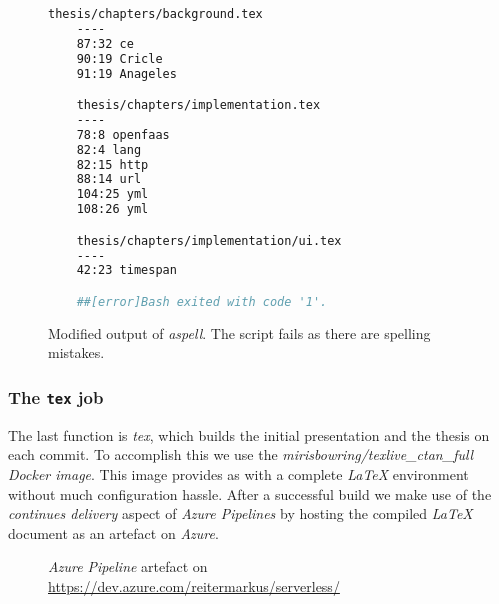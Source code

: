 \begin{figure}[H]
  \begin{lstlisting}[language=bash, basicstyle=\small\ttfamily]
    thesis/chapters/background.tex
    ----
    87:32 ce
    90:19 Cricle
    91:19 Anageles

    thesis/chapters/implementation.tex
    ----
    78:8 openfaas
    82:4 lang
    82:15 http
    88:14 url
    104:25 yml
    108:26 yml

    thesis/chapters/implementation/ui.tex
    ----
    42:23 timespan

    ##[error]Bash exited with code '1'.
  \end{lstlisting}
  \caption{Modified output of \textit{aspell}. The script fails as there are spelling mistakes.}
\end{figure}

\subsubsection{The \texttt{tex} job}

The last function is \textit{tex}, which builds the initial presentation and the thesis on each
commit. To accomplish this we use the \textit{mirisbowring/texlive\_ctan\_full Docker image}. This
image provides as with a complete \textit{LaTeX} environment without much configuration hassle.
After a successful build we make use of the \textit{continues delivery} aspect of \textit{Azure
Pipelines} by hosting the compiled \textit{LaTeX} document as an artefact on \textit{Azure}.

\begin{figure}[H]
  \centering
  \caption{\textit{Azure Pipeline} artefact on \url{https://dev.azure.com/reitermarkus/serverless/}}
\end{figure}
